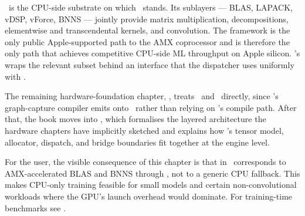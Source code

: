 \Accelerate\ is the CPU-side substrate on which \Lucid\ stands. Its
sublayers --- BLAS, LAPACK, vDSP, vForce, BNNS --- jointly provide
matrix multiplication, decompositions, elementwise and
transcendental kernels, and convolution. The framework is the only
public Apple-supported path to the AMX coprocessor and is therefore
the only path that achieves competitive CPU-side ML throughput on
Apple silicon. \Lucid's  wraps the
relevant subset behind an  interface that the
dispatcher uses uniformly with .

The remaining hardware-foundation chapter, ,
treats \Metal\ and \MPSGraph\ directly, since \Lucid's
graph-capture compiler emits onto \MPSGraph\ rather than relying on
\MLX's compile path. After that, the book moves into
, which formalises the layered architecture
the hardware chapters have implicitly sketched and explains how
\Lucid's tensor model, allocator, dispatch, and bridge boundaries
fit together at the engine level.

\begin{lucidtip}
For the user, the visible consequence of this chapter is that
 in \Lucid\ corresponds to AMX-accelerated BLAS
and BNNS through \Accelerate, not to a generic CPU fallback. This
makes CPU-only training feasible for small models and certain
non-convolutional workloads where the GPU's launch overhead would
dominate. For training-time benchmarks see .
\end{lucidtip}
